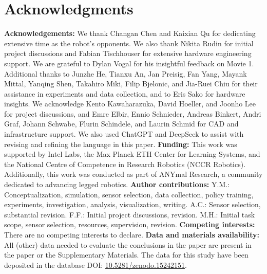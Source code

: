 \documentclass[9pt,twocolumn,twoside]{osajnl}
\begin{document}
\section*{Acknowledgments}
\textbf{Acknowledgements:} We thank Changan Chen and Kaixian Qu for dedicating extensive time as the robot's opponents. We also thank Nikita Rudin for initial project discussions and Fabian Tischhouser for extensive hardware engineering support. We are grateful to Dylan Vogal for his insightful feedback on Movie 1. Additional thanks to Junzhe He, Tianxu An, Jan Preisig, Fan Yang, Mayank Mittal, Yanqing Shen, Takahiro Miki, Filip Bjelonic, and Jia-Ruei Chiu for their assistance in experiments and data collection, and to Eris Sako for hardware insights. We acknowledge Kento Kawaharazuka, David Hoeller, and Joonho Lee for project discussions, and Emre Elbir, Ennio Schnieder, Andreas Binkert, Andri Graf, Johann Schwabe, Flurin Schindele, and Laurin Schmid for CAD and infrastructure support. We also used ChatGPT and DeepSeek to assist with revising and refining the language in this paper. \textbf{Funding:} This work was supported by Intel Labs, the Max Planck ETH Center for Learning Systems, and the National Centre of Competence in Research Robotics (NCCR Robotics). Additionally, this work was conducted as part of ANYmal Research, a community dedicated to advancing legged robotics. \textbf{Author contributions:} Y.M.: Conceptualization, simulation, sensor selection, data collection, policy training, experiments, investigation, analysis, visualization, writing. A.C.: Sensor selection, substantial revision. F.F.: Initial project discussions, revision. M.H.: Initial task scope, sensor selection, resources, supervision, revision. \textbf{Competing interests:} There are no competing interests to declare. \textbf{Data and materials availability:} All (other) data needed to evaluate the conclusions in the paper are present in the paper or the Supplementary Materials. The data for this study have been deposited in the database DOI: \href{https://doi.org/10.5281/zenodo.15242151}{10.5281/zenodo.15242151}.
\end{document}
